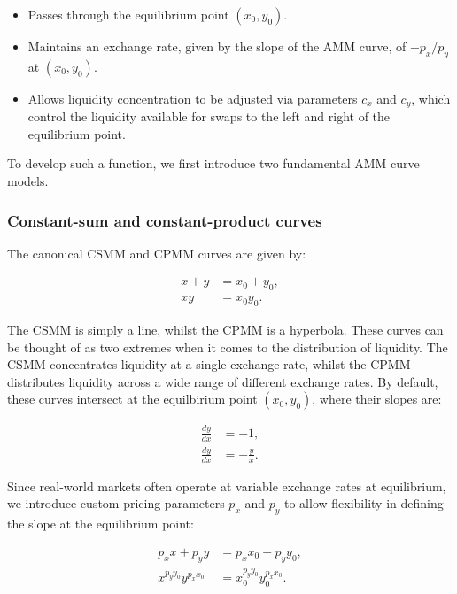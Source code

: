 \documentclass{article}
\begin{document}
\begin{itemize}
    \item Passes through the equilibrium point $(x_0, y_0)$.
    \item Maintains an exchange rate, given by the slope of the AMM curve, of $-p_x / p_y$ at $(x_0, y_0)$.
    \item Allows liquidity concentration to be adjusted via parameters $c_x$ and $c_y$, which control the liquidity available for swaps to the left and right of the equilibrium point.
\end{itemize}

To develop such a function, we first introduce two fundamental AMM curve models.

\subsubsection{Constant-sum and constant-product curves}

The canonical CSMM and CPMM curves are given by:

\begin{align}
    x + y &= x_0 + y_0, \\
    xy &= x_0 y_0.
\end{align}

The CSMM is simply a line, whilst the CPMM is a hyperbola. These curves can be thought of as two extremes when it comes to the distribution of liquidity. The CSMM concentrates liquidity at a single exchange rate, whilst the CPMM distributes liquidity across a wide range of different exchange rates. By default, these curves intersect at the equilbirium point $(x_0, y_0)$, where their slopes are:

\begin{align}
    \frac{dy}{dx} &= -1, \\
    \frac{dy}{dx} &= -\frac{y}{x}.
\end{align}

Since real-world markets often operate at variable exchange rates at equilibrium, we introduce custom pricing parameters $p_x$ and $p_y$ to allow flexibility in defining the slope at the equilibrium point:

\begin{align}
    \label{eq:weighted-line}
    p_x x + p_y y &= p_x x_0 + p_y y_0, \\
    \label{eq:exponential-form}
    x^{p_y y_0} y^{p_x x_0} &= x_0^{p_y y_0} y_0^{p_x x_0}.
\end{align}
\end{document}
